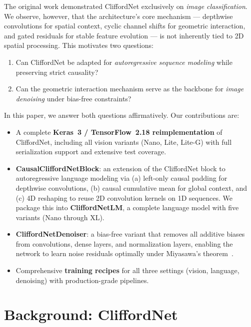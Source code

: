 \documentclass{article}
\begin{document}
The original work demonstrated CliffordNet exclusively on \emph{image classification}.
We observe, however, that the architecture's core mechanism --- depthwise convolutions for spatial context, cyclic channel shifts for geometric interaction, and gated residuals for stable feature evolution --- is not inherently tied to 2D spatial processing.
This motivates two questions:
\begin{enumerate}
  \item Can CliffordNet be adapted for \emph{autoregressive sequence modeling} while preserving strict causality?
  \item Can the geometric interaction mechanism serve as the backbone for \emph{image denoising} under bias-free constraints?
\end{enumerate}

In this paper, we answer both questions affirmatively. Our contributions are:

\begin{itemize}
  \item A complete \textbf{Keras~3 / TensorFlow~2.18 reimplementation} of CliffordNet, including all vision variants (Nano, Lite, Lite-G) with full serialization support and extensive test coverage.
  \item \textbf{CausalCliffordNetBlock}: an extension of the CliffordNet block to autoregressive language modeling via (a) left-only causal padding for depthwise convolutions, (b) causal cumulative mean for global context, and (c) 4D reshaping to reuse 2D convolution kernels on 1D sequences. We package this into \textbf{CliffordNetLM}, a complete language model with five variants (Nano through XL).
  \item \textbf{CliffordNetDenoiser}: a bias-free variant that removes all additive biases from convolutions, dense layers, and normalization layers, enabling the network to learn noise residuals optimally under Miyasawa's theorem~\citep{miyasawa1961empirical}.
  \item Comprehensive \textbf{training recipes} for all three settings (vision, language, denoising) with production-grade pipelines.
\end{itemize}

\section{Background: CliffordNet}
\label{sec:background}
\end{document}

